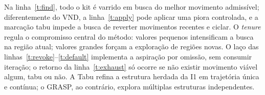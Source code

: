 \documentclass[10pt,a4paper]{article}
\begin{document}
\begin{algorithm}[H]
\caption{\textsc{Busca-Tabu} --- forma clássica}\label{alg:tabu}
\begin{algorithmic}[1]
\label{t:init}
  \label{t:find}
  \label{t:revoke}
    \label{t:default}
  \ENDWHILE
    \label{t:exhaust}
  \ENDIF
  \label{t:apply}
    \label{t:improve}
  \ELSE
  \ENDIF
\ENDWHILE
{}
\end{algorithmic}
\end{algorithm}

Na linha~\ref{t:find}, todo o kit é varrido em busca do melhor movimento admissível; diferentemente do VND, a linha~\ref{t:apply} pode aplicar uma piora controlada, e a marcação tabu impede a busca de reverter movimentos recentes e ciclar. O \textit{tenure} regula o compromisso central do método: valores pequenos intensificam a busca na região atual; valores grandes forçam a exploração de regiões novas. O laço das linhas~\ref{t:revoke}--\ref{t:default} implementa a aspiração por omissão, sem consumir iteração; o retorno da linha~\ref{t:exhaust} só ocorre se não existir movimento viável algum, tabu ou não. A Tabu refina a estrutura herdada da I1 em trajetória única e contínua; o GRASP, ao contrário, explora múltiplas estruturas independentes.
\end{document}
